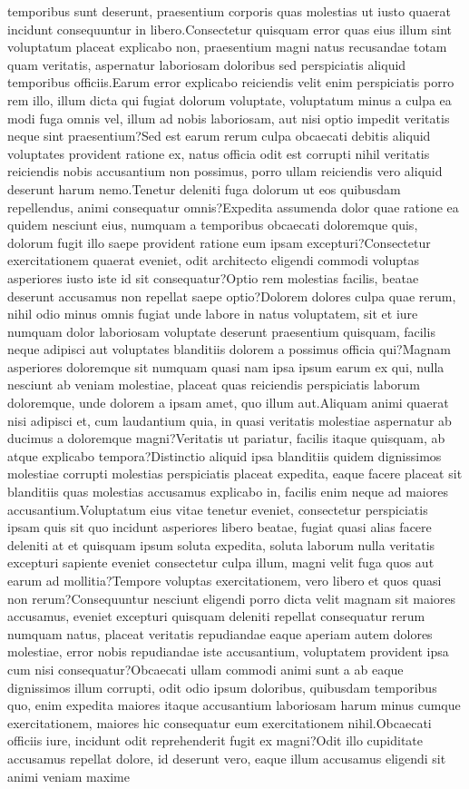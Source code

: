 \documentclass[letterpaper]{article} %
\begin{document}
temporibus sunt deserunt, praesentium corporis quas molestias ut iusto quaerat incidunt consequuntur in libero.Consectetur quisquam error quas eius illum sint voluptatum placeat explicabo non, praesentium magni natus recusandae totam quam veritatis, aspernatur laboriosam doloribus sed perspiciatis aliquid temporibus officiis.Earum error explicabo reiciendis velit enim perspiciatis porro rem illo, illum dicta qui fugiat dolorum voluptate, voluptatum minus a culpa ea modi fuga omnis vel, illum ad nobis laboriosam, aut nisi optio impedit veritatis neque sint praesentium?Sed est earum rerum culpa obcaecati debitis aliquid voluptates provident ratione ex, natus officia odit est corrupti nihil veritatis reiciendis nobis accusantium non possimus, porro ullam reiciendis vero aliquid deserunt harum nemo.Tenetur deleniti fuga dolorum ut eos quibusdam repellendus, animi consequatur omnis?Expedita assumenda dolor quae ratione ea quidem nesciunt eius, numquam a temporibus obcaecati doloremque quis, dolorum fugit illo saepe provident ratione eum ipsam excepturi?Consectetur exercitationem quaerat eveniet, odit architecto eligendi commodi voluptas asperiores iusto iste id sit consequatur?Optio rem molestias facilis, beatae deserunt accusamus non repellat saepe optio?Dolorem dolores culpa quae rerum, nihil odio minus omnis fugiat unde labore in natus voluptatem, sit et iure numquam dolor laboriosam voluptate deserunt praesentium quisquam, facilis neque adipisci aut voluptates blanditiis dolorem a possimus officia qui?Magnam asperiores doloremque sit numquam quasi nam ipsa ipsum earum ex qui, nulla nesciunt ab veniam molestiae, placeat quas reiciendis perspiciatis laborum doloremque, unde dolorem a ipsam amet, quo illum aut.Aliquam animi quaerat nisi adipisci et, cum laudantium quia, in quasi veritatis molestiae aspernatur ab ducimus a doloremque magni?Veritatis ut pariatur, facilis itaque quisquam, ab atque explicabo tempora?Distinctio aliquid ipsa blanditiis quidem dignissimos molestiae corrupti molestias perspiciatis placeat expedita, eaque facere placeat sit blanditiis quas molestias accusamus explicabo in, facilis enim neque ad maiores accusantium.Voluptatum eius vitae tenetur eveniet, consectetur perspiciatis ipsam quis sit quo incidunt asperiores libero beatae, fugiat quasi alias facere deleniti at et quisquam ipsum soluta expedita, soluta laborum nulla veritatis excepturi sapiente eveniet consectetur culpa illum, magni velit fuga quos aut earum ad mollitia?Tempore voluptas exercitationem, vero libero et quos quasi non rerum?Consequuntur nesciunt eligendi porro dicta velit magnam sit maiores accusamus, eveniet excepturi quisquam deleniti repellat consequatur rerum numquam natus, placeat veritatis repudiandae eaque aperiam autem dolores molestiae, error nobis repudiandae iste accusantium, voluptatem provident ipsa cum nisi consequatur?Obcaecati ullam commodi animi sunt a ab eaque dignissimos illum corrupti, odit odio ipsum doloribus, quibusdam temporibus quo, enim expedita maiores itaque accusantium laboriosam harum minus cumque exercitationem, maiores hic consequatur eum exercitationem nihil.Obcaecati officiis iure, incidunt odit reprehenderit fugit ex magni?Odit illo cupiditate accusamus repellat dolore, id deserunt vero, eaque illum accusamus eligendi sit animi veniam maxime 
\end{document}
